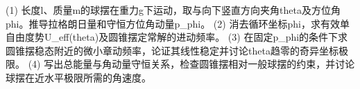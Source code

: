 (1) 长度l、质量m的球摆在重力g下运动，取与向下竖直方向夹角theta及方位角phi。推导拉格朗日量和守恒方位角动量p_phi。
(2) 消去循环坐标phi，求有效单自由度势U_eff(theta)及圆锥摆定常解的进动频率。
(3) 在固定p_phi的条件下求圆锥摆稳态附近的微小章动频率，论证其线性稳定并讨论theta趋零的奇异坐标极限。
(4) 写出总能量与角动量守恒关系，检查圆锥摆相对一般球摆的约束，并讨论球摆在近水平极限所需的角速度。
